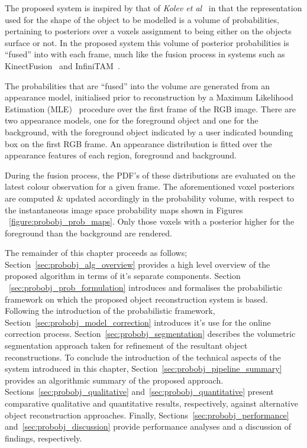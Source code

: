 The proposed system is inspired by that of \textit{Kolev et al}~\cite{Kolev2006} 
in that the representation used for the shape of the object to be modelled is a 
volume of probabilities, pertaining to posteriors over a voxels assignment to 
being either on the objects surface or not. In the proposed system this volume 
of posterior probabilities is ``fused'' into with each frame, much like the 
fusion process in systems such as KinectFusion~\cite{Newcombe2011} and 
InfiniTAM~\cite{Prisacariu2014}.

The probabilities that are ``fused'' into the volume are generated from an
appearance model, initialised prior to reconstruction by a Maximum Likelihood 
Estimation (MLE)~\cite{BishopPRML} procedure over the first frame of the RGB image. 
There are two appearance models, one for the foreground object and one for the 
background, with the foreground object indicated by a user indicated bounding box 
on the first RGB frame. An appearance distribution is fitted over the appearance 
features of each region, foreground and background. 

During the fusion process, the PDF's of these distributions are evaluated on the latest 
colour observation for a given frame. The aforementioned voxel posteriors are computed \& updated accordingly 
in the probability volume, with respect to the instantaneous image space probability maps shown in Figures
~\ref{figure:probobj_prob_maps}. Only those voxels with a posterior higher for the foreground than the 
background are rendered.

The remainder of this chapter proceeds as follows; Section~\ref{sec:probobj_alg_overview} provides a high 
level overview of the proposed algorithm in terms of it's separate components. Section
~\ref{sec:probobj_prob_formulation} introduces and formalises the probabilistic framework on which the 
proposed object reconstruction system is based. Following the introduction of the probabilistic framework, 
Section~\ref{sec:probobj_model_correction} introduces it's use for the online correction process. 
Section~\ref{sec:probobj_segmentation} describes the volumetric segmentation approach taken for refinement 
of the resultant object reconstructions. To conclude the introduction of the technical aspects of the system 
introduced in this chapter, Section~\ref{sec:probobj_pipeline_summary} provides an algorithmic summary of the 
proposed approach. Sections~\ref{sec:probobj_qualitative} and~\ref{sec:probobj_quantitative} present comparative 
qualitative and quantitative results, respectively, against alternative object reconstruction approaches. Finally, 
Sections~\ref{sec:probobj_performance} and~\ref{sec:probobj_discussion} provide performance analyses and a 
discussion of findings, respectively.

